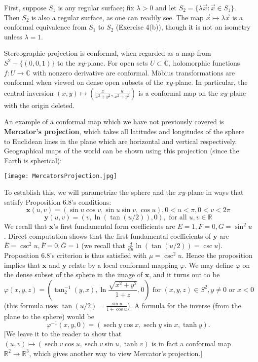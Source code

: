 \documentclass[leqno]{book}
\begin{document}
First, suppose $S_1$ is any regular surface; fix $\lambda>0$ and let $S_2=\{\lambda\vec x:\vec x\in S_1\}$.  Then $S_2$ is also a regular surface, as one can readily see.  The map $\vec x\mapsto\lambda\vec x$ is a conformal equivalence from $S_1$ to $S_2$ (Exercise 4(b)), though it is not an isometry unless $\lambda=1$.

Stereographic projection is conformal, when regarded as a map from $S^2-\{(0,0,1)\}$ to the $xy$-plane.  For open sets $U\subset\mathbb C$, holomorphic functions $f:U\to\mathbb C$ with nonzero derivative are conformal.  M\"obius transformations are conformal when viewed on dense open subsets of the $xy$-plane.  In particular, the central inversion $(x,y)\mapsto\left(\frac x{x^2+y^2},\frac y{x^2+y^2}\right)$ is a conformal map on the $xy$-plane with the origin deleted.

An example of a conformal map which we have not previously covered is \textbf{Mercator's projection}, which takes all latitudes and longitudes of the sphere to Euclidean lines in the plane which are horizontal and vertical respectively.  Geographical maps of the world can be shown using this projection (since the Earth is spherical):
\begin{center}
\texttt{[image: MercatorsProjection.jpg]}
\end{center}
To establish this, we will parametrize the sphere and the $xy$-plane in ways that satisfy Proposition 6.8's conditions:
$$\mathbf x(u,v)=(\sin u\cos v,\sin u\sin v,\cos u),0<u<\pi,0<v<2\pi$$
$$\mathbf y(u,v)=(v,\ln(\tan(u/2)),0),\text{ for all }u,v\in\mathbb R$$
We recall that $\mathbf x$'s first fundamental form coefficients are $E=1,F=0,G=\sin^2u$.  Direct computation shows that the first fundamental coefficients of $\mathbf y$ are $\overline E=\csc^2u,\overline F=0,\overline G=1$ (we recall that $\frac{d}{du}\ln(\tan(u/2))=\csc u$).  Proposition 6.8's criterion is thus satisfied with $\mu=\csc^2u$.  Hence the proposition implies that $\mathbf x$ and $\mathbf y$ relate by a local conformal mapping $\varphi$.  We may define $\varphi$ on the dense subset of the sphere in the image of $\mathbf x$, and it turns out to be
$$\varphi(x,y,z)=\left(\tan^{-1}_2(y,x),\ln\frac{\sqrt{x^2+y^2}}{1+z},0\right)\text{ for }(x,y,z)\in S^2,y\ne 0\text{ or }x<0$$
(this formula uses $\tan(u/2)=\frac{\sin u}{1+\cos u}$).  A formula for the inverse (from the plane to the sphere) would be
$$\varphi^{-1}(x,y,0)=(\operatorname{sech}y\cos x,\operatorname{sech}y\sin x,\tanh y).$$
[We leave it to the reader to show that $(u,v)\mapsto(\operatorname{sech}v\cos u,\operatorname{sech}v\sin u,\tanh v)$ is in fact a conformal map $\mathbb R^2\to\mathbb R^3$, which gives another way to view Mercator's projection.]
\end{document}
